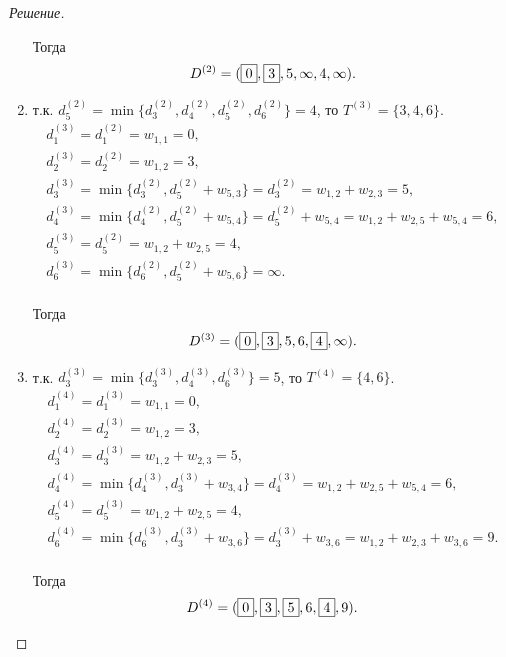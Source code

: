 \begin{proof}[Решение]
\begin{enumerate}
        Тогда 
        \[
            D^{(2)}=(\fbox{0},\fbox{3},5,\infty,4,\infty).
        \]
        
        \item т.к. $d_5^{(2)}=\min\{d_3^{(2)},d_4^{(2)},d_5^{(2)},d_6^{(2)}\}=4$, то $T^{(3)}=\{3,4,6\}$.
        \[
            \begin{split}
                d_1^{(3)}=d_1^{(2)}=w_{1,1}=0,\\
                d_2^{(3)}=d_2^{(2)}=w_{1,2}=3,\\
                d_3^{(3)}=\min\{d_3^{(2)}, d_5^{(2)}+w_{5,3}\}=d_3^{(2)}=w_{1,2}+w_{2,3}=5,\\
                d_4^{(3)}=\min\{d_4^{(2)}, d_5^{(2)}+w_{5,4}\}=d_5^{(2)}+w_{5,4}=w_{1,2}+w_{2,5}+w_{5,4}=6,\\
                d_5^{(3)}=d_5^{(2)}=w_{1,2}+w_{2,5}=4,\\
                d_6^{(3)}=\min\{d_6^{(2)}, d_5^{(2)}+w_{5,6}\}=\infty.\\
            \end{split}
        \]
        
        Тогда
        \[
            D^{(3)}=(\fbox{0},\fbox{3},5,6,\fbox{4},\infty).
        \]

        \item т.к. $d_3^{(3)}=\min\{d_3^{(3)},d_4^{(3)},d_6^{(3)}\}=5$, то $T^{(4)}=\{4,6\}$.
        \[
            \begin{split}
                d_1^{(4)}=d_1^{(3)}=w_{1,1}=0,\\
                d_2^{(4)}=d_2^{(3)}=w_{1,2}=3,\\
                d_3^{(4)}=d_3^{(3)}=w_{1,2}+w_{2,3}=5,\\
                d_4^{(4)}=\min\{d_4^{(3)}, d_3^{(3)}+w_{3,4}\}=d_4^{(3)}=w_{1,2}+w_{2,5}+w_{5,4}=6,\\
                d_5^{(4)}=d_5^{(3)}=w_{1,2}+w_{2,5}=4,\\
                d_6^{(4)}=\min\{d_6^{(3)}, d_3^{(3)}+w_{3,6}\}=d_3^{(3)}+w_{3,6}=w_{1,2}+w_{2,3}+w_{3,6}=9.\\
            \end{split}
        \]
        
        Тогда
        \[
            D^{(4)}=(\fbox{0},\fbox{3},\fbox{5},6,\fbox{4},9).
        \]


\end{enumerate}
\end{proof}
